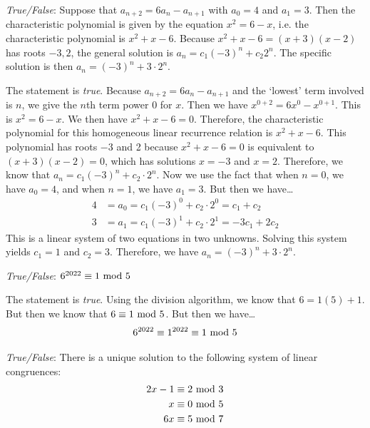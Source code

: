 \documentclass[11pt,letterpaper]{article}
\begin{document}
\newpage





\quizsol \textit{True/False}: Suppose that $a_{n+2}= 6a_n - a_{n+1}$ with $a_0= 4$ and $a_1= 3$. Then the characteristic polynomial is given by the equation $x^2= 6 - x$, i.e. the characteristic polynomial is $x^2 + x - 6$. Because $x^2 + x - 6= (x + 3)(x - 2)$ has roots $-3, 2$, the general solution is $a_n= c_1(-3)^n + c_2 2^n$. The specific solution is then $a_n= (-3)^n + 3 \cdot 2^n$. \pspace

\sol The statement is \textit{true}. Because $a_{n+2}= 6a_n - a_{n+1}$ and the `lowest' term involved is $n$, we give the $n$th term power 0 for $x$. Then we have $x^{0 + 2}= 6 x^0 - x^{0 + 1}$. This is $x^2= 6 - x$. We then have $x^2 + x - 6= 0$. Therefore, the characteristic polynomial for this homogeneous linear recurrence relation is $x^2 + x - 6$. This polynomial has roots $-3$ and 2 because $x^2 + x - 6= 0$ is equivalent to $(x + 3)(x - 2)= 0$, which has solutions $x= -3$ and $x= 2$. Therefore, we know that $a_n= c_1 (-3)^n + c_2 \cdot 2^n$. Now we use the fact that when $n= 0$, we have $a_0= 4$, and when $n= 1$, we have $a_1= 3$. But then we have\dots
	\[
	\begin{aligned}
	4&= a_0= c_1 (-3)^0 + c_2 \cdot 2^0= c_1 + c_2 \\[0.3cm]
	3&= a_1= c_1 (-3)^1 + c_2 \cdot 2^1= -3c_1 + 2c_2
	\end{aligned}
	\]
This is a linear system of two equations in two unknowns. Solving this system yields $c_1= 1$ and $c_2= 3$. Therefore, we have $a_n= (-3)^n + 3 \cdot 2^n$. \pvspace{1.5cm}



\quizsol \textit{True/False}: $6^{2022} \equiv 1 \text{ mod } 5$ \pspace

\sol The statement is \textit{true}. Using the division algorithm, we know that $6= 1(5) + 1$. But then we know that $6 \equiv 1 \text{ mod } 5$. But then we have\dots
	\[
	6^{2022} \equiv 1^{2022} \equiv 1 \text{ mod } 5
	\] \pvspace{1.5cm}



\quizsol \textit{True/False}: There is a unique solution to the following system of linear congruences:
	\[
	\begin{aligned}
	2x - 1 &\equiv 2 \text{ mod } 3 \\
	x &\equiv 0 \text{ mod } 5 \\
	6x &\equiv 5 \text{ mod } 7
	\end{aligned}
	\] 
\end{document}
